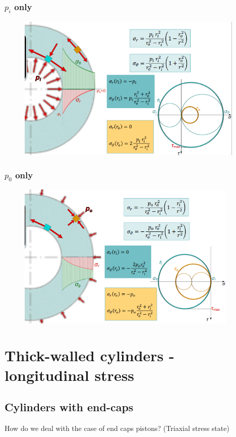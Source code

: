 \documentclass[class=report, crop=false, 12pt,a4paper]{standalone}
\begin{document}
\subsubsection{$p_i$ only}
\begin{figure}[H]
    \centering
    \includegraphics[height = 7cm]{../img/diagram114.png}
    \caption{}
\end{figure}
\subsubsection{$p_0$ only}
\begin{figure}[H]
    \centering
    \includegraphics[height = 7cm]{../img/diagram115.png}
    \caption{}
\end{figure}
\section{Thick-walled cylinders - longitudinal stress}
\subsection{Cylinders with end-caps}
How do we deal with the case of end caps pistons? (Triaxial stress state)
\end{document}
